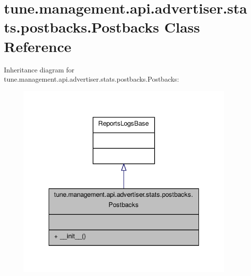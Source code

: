 \hypertarget{classtune_1_1management_1_1api_1_1advertiser_1_1stats_1_1postbacks_1_1Postbacks}{\section{tune.\-management.\-api.\-advertiser.\-stats.\-postbacks.\-Postbacks Class Reference}
\label{classtune_1_1management_1_1api_1_1advertiser_1_1stats_1_1postbacks_1_1Postbacks}
}


Inheritance diagram for tune.\-management.\-api.\-advertiser.\-stats.\-postbacks.\-Postbacks\-:
\nopagebreak
\begin{figure}[H]
\begin{center}
\leavevmode
\includegraphics[width=310pt]{classtune_1_1management_1_1api_1_1advertiser_1_1stats_1_1postbacks_1_1Postbacks__inherit__graph}
\end{center}
\end{figure}


